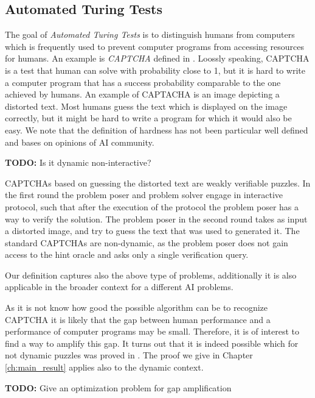 \subsection{Automated Turing Tests}
The goal of \textit{Automated Turing Tests} is to distinguish humans from computers which
is frequently used to prevent computer programs from accessing resources for humans.
An example is \textit{CAPTCHA} defined in \cite{von2003captcha}.
Loossly speaking, CAPTCHA is a test that human can solve with probability close to 1, but it is hard to write a computer program
that has a success probability comparable to the one achieved by humans.
An example of CAPTACHA is an image depicting a distorted text. Most humans guess the text which is displayed on the image correctly, but it might be hard to write
a program for which it would also be easy. We note that the definition of hardness has not been particular well defined
and bases on opinions of AI community.
\begin{todo}
  \textbf{TODO:} Is it dynamic non-interactive?
\end{todo}
CAPTCHAs based on guessing the distorted text are weakly verifiable puzzles.
In the first round the problem poser and problem solver engage in interactive protocol, such that
after the execution of the protocol the problem poser has a way to verify the solution.
The problem poser in the second round takes as input a distorted image, and try to guess the text that was used to generated it.
The standard CAPTCHAs are non-dynamic, as the problem poser does not gain access to the hint oracle and
asks only a single verification query.

Our definition captures also the above type of problems, additionally it is also applicable in the broader context for a different
AI problems.

As it is not know how good the possible algorithm can be to recognize CAPTCHA it is likely that the gap between human
performance and a performance of computer programs may be small. Therefore, it is of interest to find a way to amplify this gap.
It turns out that it is indeed possible which for not dynamic puzzles was proved in \cite{DBLP:journals/corr/abs-1002-3534}.
The proof we give in Chapter \ref{ch:main_result} applies also to the dynamic context.

\begin{todo}
  \textbf{TODO:} Give an optimization problem for gap amplification
\end{todo}


